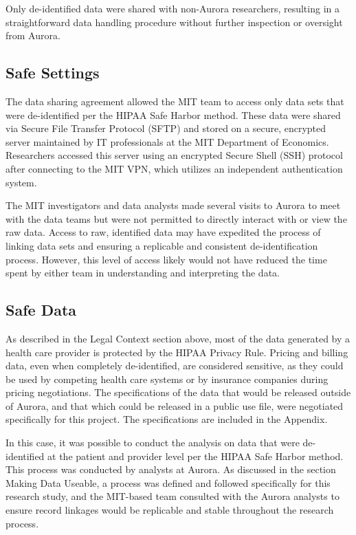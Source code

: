 Only de-identified data were shared with non-Aurora researchers, resulting in a straightforward data handling procedure without further inspection or oversight from Aurora.

\hypertarget{safe-settings-3}{%
\subsection{Safe Settings}\label{safe-settings-3}}

The data sharing agreement allowed the MIT team to access only data sets that were de-identified per the HIPAA Safe Harbor method. These data were shared via Secure File Transfer Protocol (SFTP) and stored on a secure, encrypted server maintained by IT professionals at the MIT Department of Economics. Researchers accessed this server using an encrypted Secure Shell (SSH) protocol after connecting to the MIT VPN, which utilizes an independent authentication system.

The MIT investigators and data analysts made several visits to Aurora to meet with the data teams but were not permitted to directly interact with or view the raw data. Access to raw, identified data may have expedited the process of linking data sets and ensuring a replicable and consistent de-identification process. However, this level of access likely would not have reduced the time spent by either team in understanding and interpreting the data.

\hypertarget{safe-data-3}{%
\subsection{Safe Data}\label{safe-data-3}}

As described in the Legal Context section above, most of the data generated by a health care provider is protected by the HIPAA Privacy Rule. Pricing and billing data, even when completely de-identified, are considered sensitive, as they could be used by competing health care systems or by insurance companies during pricing negotiations. The specifications of the data that would be released outside of Aurora, and that which could be released in a public use file, were negotiated specifically for this project. The specifications are included in the Appendix.

In this case, it was possible to conduct the analysis on data that were de-identified at the patient and provider level per the HIPAA Safe Harbor method. This process was conducted by analysts at Aurora. As discussed in the section Making Data Useable, a process was defined and followed specifically for this research study, and the MIT-based team consulted with the Aurora analysts to ensure record linkages would be replicable and stable throughout the research process.

